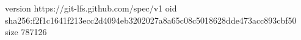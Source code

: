 version https://git-lfs.github.com/spec/v1
oid sha256:f2f1c1641f213ecc2d4094eb3202027a8a65c08c5018628dde473acc893cbf50
size 787126
